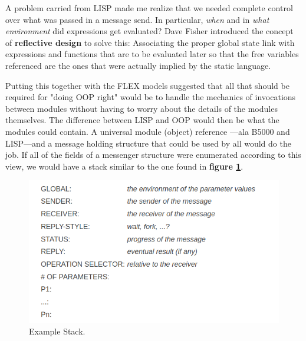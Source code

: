 \documentclass[letterpaper,12pt,parskip=full]{article}
\begin{document}
 A problem carried from LISP made me realize that we needed complete control over what was passed in a message send. In particular, \textit{when} and in \textit{what environment} did expressions get evaluated? Dave Fisher introduced the concept of \textbf{reflective design} to solve this: Associating the proper global state link with expressions and functions that are to be evaluated later so that the free variables referenced are the ones that were actually implied by the static language. 
 
 Putting this together with the FLEX models suggested that all that should be required for "doing OOP right" would be to handle the mechanics of invocations between modules without having to worry about the details of the modules themselves. The difference between LISP and OOP would then be what the modules could contain. A universal module (object) reference —ala B5000 and LISP—and a message holding structure that could be used by all would do the job. If all of the fields of a messenger structure were enumerated according to this view, we would have a stack similar to the one found in \textbf{figure \ref{fig:B5000_stack}}.

 \begin{figure}[ht]
        \centering \includegraphics[scale=0.85]{B5000_STACK.png}
        \caption{
                \label{fig:B5000_stack} %
                Example Stack.
        }
\end{figure}
\end{document}
